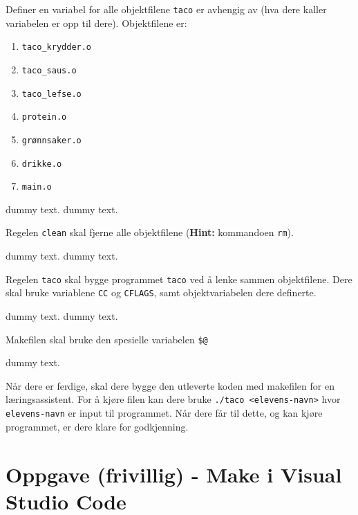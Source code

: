 \begin{subprob}
    Definer en variabel for alle objektfilene \verb|taco| er avhengig av (hva dere kaller variabelen er opp til dere). Objektfilene er:
    \begin{enumerate}
        \item \verb|taco_krydder.o|
        \item \verb|taco_saus.o|
        \item \verb|taco_lefse.o|
        \item \verb|protein.o|
        \item \verb|grønnsaker.o|
        \item \verb|drikke.o|
        \item \verb|main.o|	
    \end{enumerate}
	\begin{solution}
        dummy text. dummy text. 
	\end{solution}
\end{subprob}


\begin{subprob}
    Regelen \verb|clean| skal fjerne alle objektfilene (\textbf{Hint:} kommandoen \verb|rm|).
	\begin{solution}
        dummy text. dummy text. 
	\end{solution}
\end{subprob}


\begin{subprob}
    Regelen \verb|taco| skal bygge programmet \verb|taco| ved å lenke sammen objektfilene. Dere skal bruke variablene \verb|CC| og \verb|CFLAGS|, samt objektvariabelen dere definerte.
	\begin{solution}
        dummy text. dummy text. 
	\end{solution}
\end{subprob}


\begin{subprob}
    Makefilen skal bruke den spesielle variabelen \verb|$@|
	\begin{solution}
	    dummy text. 
	\end{solution}
\end{subprob}



Når dere er ferdige, skal dere bygge den utleverte koden med makefilen for en læringsassistent. For å kjøre filen kan dere bruke \verb|./taco <elevens-navn>| hvor \verb|elevens-navn| er input til programmet. Når dere får til dette, og kan kjøre programmet, er dere klare for godkjenning.

\section{Oppgave (frivillig) - Make i Visual Studio Code}
